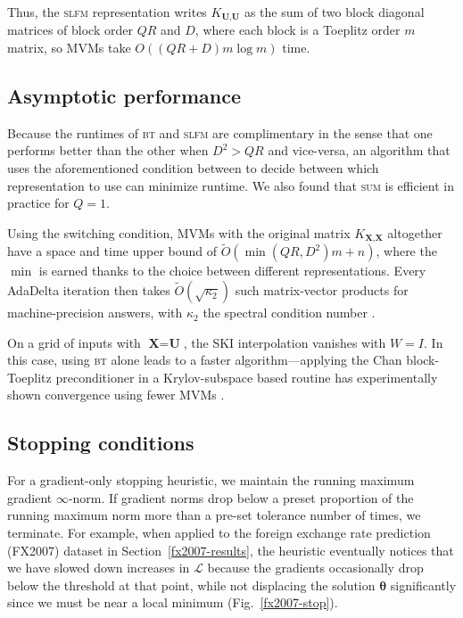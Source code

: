 \documentclass{article}
\def\bsth{{\boldsymbol\theta}}
\def \mcL {\mathcal{L}}
\def\TX{\textbf{X}}
\def\TU{\textbf{U}}
\begin{document}
Thus, the \textsc{slfm} representation writes $K_{\TU,\TU}$ as the sum of two block diagonal matrices of block order $QR$ and $D$, where each block is a Toeplitz order $m$ matrix, so MVMs take $O((QR + D)m\log m)$ time.

\subsection{Asymptotic performance}

Because the runtimes of \textsc{bt} and \textsc{slfm} are complimentary in the sense that one performs better than the other when $D^2>QR$ and vice-versa, an algorithm that uses the aforementioned condition between to decide between which representation to use can minimize runtime. We also found that \textsc{sum} is efficient in practice for $Q=1$.

Using the switching condition, MVMs with the original matrix $K_{\TX,\TX}$ altogether have a space and time upper bound of $\tilde{O}(\min(QR,D^2)m+n)$, where the $\min$ is earned thanks to the choice between different representations. Every AdaDelta iteration then takes $\tilde{O}(\sqrt{\kappa_2})$ such matrix-vector products for machine-precision answers, with $\kappa_2$ the spectral condition number \cite{raykar2007fast}.

On a grid of inputs with $\TX=\TU$, the SKI interpolation vanishes with $W=I$. In this case, using \textsc{bt} alone leads to a faster algorithm---applying the Chan block-Toeplitz preconditioner in a Krylov-subspace based routine has experimentally shown convergence using fewer MVMs \cite{chan1994circulant}.

\subsection{Stopping conditions}\label{stopping}

For a gradient-only stopping heuristic, we maintain the running maximum gradient $\infty$-norm. If gradient norms drop below a preset proportion of the running maximum norm more than a pre-set tolerance number of times, we terminate. For example, when applied to the foreign exchange rate prediction (FX2007) dataset in Section~\ref{fx2007-results}, the heuristic eventually notices that we have slowed down increases in $\mcL$ because the gradients occasionally drop below the threshold at that point, while not displacing the solution $\bsth$ significantly since we must be near a local minimum (Fig.~\ref{fx2007-stop}). 
\end{document}
